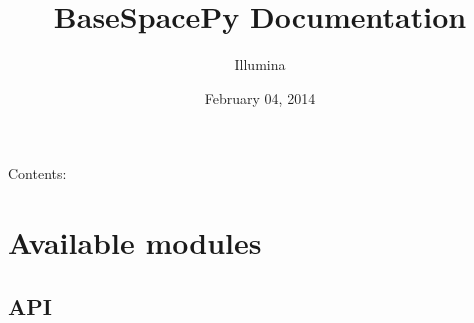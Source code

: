 \documentclass[letterpaper,10pt,english]{sphinxmanual}
\title{BaseSpacePy Documentation}
\date{February 04, 2014}
\author{Illumina}
\begin{document}
\maketitle
\tableofcontents
{}\label{index::doc}


Contents:


\chapter{Available modules}
\label{Available modules:available-modules}\label{Available modules::doc}\label{Available modules:basespacepy}

\section{API}
\label{Available modules:api}
\end{document}
